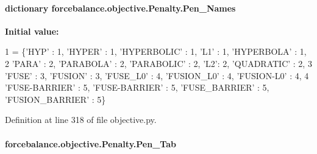 \hypertarget{classforcebalance_1_1objective_1_1Penalty_a0565dc1b08520f13edc984c14aa7ceb8}{
\paragraph[{Pen\-\_\-\-Names}]{\setlength{\rightskip}{0pt plus 5cm}dictionary forcebalance.\-objective.\-Penalty.\-Pen\-\_\-\-Names\hspace{0.3cm}{\ttfamily [static]}}}\label{classforcebalance_1_1objective_1_1Penalty_a0565dc1b08520f13edc984c14aa7ceb8}
{\bfseries Initial value\-:}
\begin{DoxyCode}
1 = \{\textcolor{stringliteral}{'HYP'} : 1, \textcolor{stringliteral}{'HYPER'} : 1, \textcolor{stringliteral}{'HYPERBOLIC'} : 1, \textcolor{stringliteral}{'L1'} : 1, \textcolor{stringliteral}{'HYPERBOLA'} : 1,
2                       \textcolor{stringliteral}{'PARA'} : 2, \textcolor{stringliteral}{'PARABOLA'} : 2, \textcolor{stringliteral}{'PARABOLIC'} : 2, \textcolor{stringliteral}{'L2'}: 2, \textcolor{stringliteral}{'QUADRATIC'} : 2,
3                       \textcolor{stringliteral}{'FUSE'} : 3, \textcolor{stringliteral}{'FUSION'} : 3, \textcolor{stringliteral}{'FUSE\_L0'} : 4, \textcolor{stringliteral}{'FUSION\_L0'} : 4, \textcolor{stringliteral}{'FUSION-L0'} : 4,
4                       \textcolor{stringliteral}{'FUSE-BARRIER'} : 5, \textcolor{stringliteral}{'FUSE-BARRIER'} : 5, \textcolor{stringliteral}{'FUSE\_BARRIER'} : 5, \textcolor{stringliteral}{'FUSION\_BARRIER'} : 5\}
\end{DoxyCode}


Definition at line 318 of file objective.\-py.

\hypertarget{classforcebalance_1_1objective_1_1Penalty_a22bcc263d510e34d694faa9a70372a03}{
\paragraph[{Pen\-\_\-\-Tab}]{\setlength{\rightskip}{0pt plus 5cm}forcebalance.\-objective.\-Penalty.\-Pen\-\_\-\-Tab}}\label{classforcebalance_1_1objective_1_1Penalty_a22bcc263d510e34d694faa9a70372a03}


